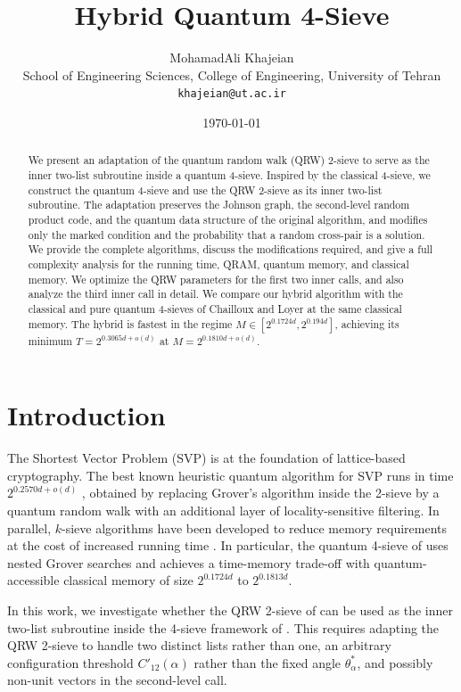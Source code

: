\documentclass[10pt,a4paper]{article}
\title{\textbf{Hybrid Quantum 4-Sieve}}
\author{
    MohamadAli Khajeian\\[0.5em]
    \normalsize School of Engineering Sciences, College of Engineering, University of Tehran\\
    \normalsize \texttt{khajeian@ut.ac.ir}
}
\date{\today}
\begin{document}
\maketitle

\begin{abstract}
We present an adaptation of the quantum random walk (QRW) 2-sieve to serve as the inner two-list subroutine inside a quantum 4-sieve. Inspired by the classical 4-sieve, we construct the quantum 4-sieve and use the QRW 2-sieve as its inner two-list subroutine. The adaptation preserves the Johnson graph, the second-level random product code, and the quantum data structure of the original algorithm, and modifies only the marked condition and the probability that a random cross-pair is a solution. We provide the complete algorithms, discuss the modifications required, and give a full complexity analysis for the running time, QRAM, quantum memory, and classical memory. We optimize the QRW parameters for the first two inner calls, and also analyze the third inner call in detail. We compare our hybrid algorithm with the classical and pure quantum 4-sieves of Chailloux and Loyer at the same classical memory. The hybrid is fastest in the regime \(M \in [2^{0.1724d}, 2^{0.194d}]\), achieving its minimum \(T = 2^{0.3065d+o(d)}\) at \(M = 2^{0.1810d+o(d)}\).
\end{abstract}

\section{Introduction}

The Shortest Vector Problem (SVP) is at the foundation of lattice-based cryptography. The best known heuristic quantum algorithm for SVP runs in time \(2^{0.2570d+o(d)}\) \cite{CL21}, obtained by replacing Grover's algorithm inside the 2-sieve by a quantum random walk with an additional layer of locality-sensitive filtering. In parallel, \(k\)-sieve algorithms have been developed to reduce memory requirements at the cost of increased running time \cite{CL23}. In particular, the quantum 4-sieve of \cite{CL23} uses nested Grover searches and achieves a time-memory trade-off with quantum-accessible classical memory of size \(2^{0.1724d}\) to \(2^{0.1813d}\).

In this work, we investigate whether the QRW 2-sieve of \cite{CL21} can be used as the inner two-list subroutine inside the 4-sieve framework of \cite{CL23}. This requires adapting the QRW 2-sieve to handle two distinct lists rather than one, an arbitrary configuration threshold \(C'_{12}(\alpha)\) rather than the fixed angle \(\theta_\alpha^*\), and possibly non-unit vectors in the second-level call.
\end{document}
